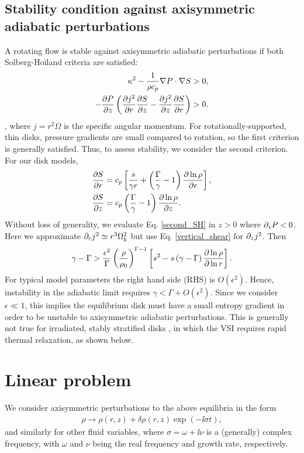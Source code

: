 \subsection{Stability condition against axisymmetric adiabatic
  perturbations}\label{solberg}
A rotating flow is stable against axisymmetric adiabatic perturbations
if both Solberg-Hoiland criteria  are satisfied:
\begin{align}
  \kappa^2 - \frac{1}{\rho c_p}\nabla P \cdot \nabla S &> 0,\\
  -\frac{\partial P}{\partial z}\left(\frac{\partial j^2}{\partial r}\frac{\partial S}{ \partial z} -
    \frac{\partial j^2}{\partial z}\frac{\partial S}{\partial r} \right)&>0. \label{second_SH} 
\end{align}
\citep{tassoul78}, where $j=r^2\Omega$ is the specific angular
momentum. For rotationally-supported, thin disks, pressure gradients are small 
compared to rotation, so the first criterion is generally
satisfied. Thus, to assess stability, we consider the second
criterion. For our disk models,
\begin{align}
  &\frac{\partial S}{\partial r} = c_p\left[\frac{s}{\gamma r} +
    \left(\frac{\Gamma}{\gamma}-1\right)\frac{\partial \ln{\rho}}{\partial
       r}\right],\\
  &\frac{\partial S}{\partial z} = c_p
  \left(\frac{\Gamma}{\gamma}-1\right)\frac{\partial \ln{\rho}}{\partial z}. 
\end{align} 
Without loss of generality, we evaluate Eq. \ref{second_SH} in $z>0$
where $\partial_zP<0$. Here we approximate $\partial_r j^2\simeq r^3\Omega_k^2$ but
use Eq. \ref{vertical_shear} for $\partial_zj^2$. Then 
\begin{align}\label{solberg2}
  \gamma - \Gamma > \frac{\epsilon^2}{\Gamma}
  \left(\frac{\rho}{\rho_0}\right)^{\Gamma-1} \left[s^2
    -s\left(\gamma-\Gamma\right)\frac{\partial\ln{\rho}}{\partial\ln{r}} \right]. 
\end{align} 
For typical model parameters the right hand side (RHS) is
$O(\epsilon^2)$. Hence, instability in the adiabatic limit 
requires $\gamma < \Gamma + O(\epsilon^2)$. Since we consider
$\epsilon\ll1$, this implies the equilibrium disk must have a small
entropy gradient in order to be unstable to axisymmetric adiabatic
perturbations. This is generally not true for irradiated, stably
stratified disks \citep{chiang97}, in which the VSI requires rapid
thermal relaxation, as shown below. 

\section{Linear problem}\label{linear}
We consider axisymmetric perturbations to the above equilibria in the
form 
\begin{align}
  \rho \to \rho(r, z) + \delta\rho(r,z)\exp{\left( - \ii\sigma
      t\right)},    
\end{align}
and similarly for other fluid variables, where $\sigma = \omega + \ii
\nu$ is a (generally) complex frequency, with $\omega$ and $\nu$ being
the real frequency and growth rate, respectively.

